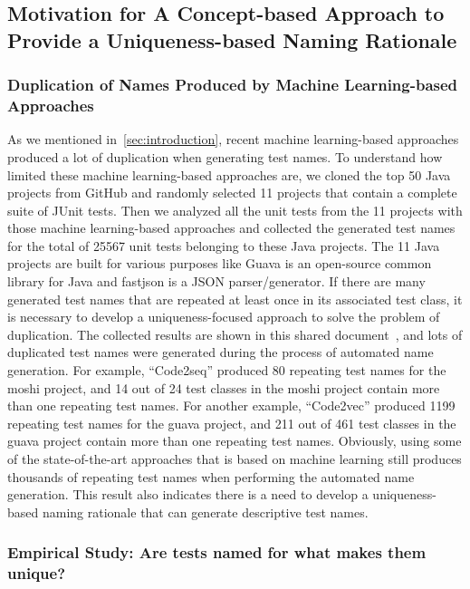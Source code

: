 \subsection{Motivation for A Concept-based Approach to Provide a Uniqueness-based Naming Rationale}

\subsubsection{Duplication of Names Produced by Machine Learning-based Approaches}
\label{sec:duplication-names}

As we mentioned in~\cref{sec:introduction}, recent machine learning-based approaches produced a lot of duplication when generating test names.
%
To understand how limited these machine learning-based approaches are, we cloned the top \num{50} Java projects from GitHub and randomly selected \num{11} projects that contain a complete suite of JUnit tests.
%
Then we analyzed all the unit tests from the \num{11} projects with those machine learning-based approaches and collected the generated test names for the total of \num{25567} unit tests belonging to these Java projects.
%
The \num{11} Java projects are built for various purposes like Guava is an open-source common library for Java and fastjson is a JSON parser\slash generator.
%
If there are many generated test names that are repeated at least once in its associated test class, it is necessary to develop a uniqueness-focused approach to solve the problem of duplication.
%
The collected results are shown in this shared document~\cite{CodeResult}, and lots of duplicated test names were generated during the process of automated name generation. 
%
For example, \enquote{Code2seq} produced \num{80} repeating test names for the moshi project, and \num{14} out of \num{24} test classes in the moshi project contain more than one repeating test names.
%
For another example, \enquote{Code2vec} produced \num{1199} repeating test names for the guava project, and \num{211} out of \num{461} test classes in the guava project contain more than one repeating test names.
%
Obviously, using some of the state-of-the-art approaches that is based on machine learning still   produces thousands of repeating test names when performing the automated name generation.
%
This result also indicates there is a need to develop a uniqueness-based naming rationale that can generate descriptive test names.


\subsubsection{Empirical Study: Are tests named for what makes them unique?}
\label{sec:empStudy}

